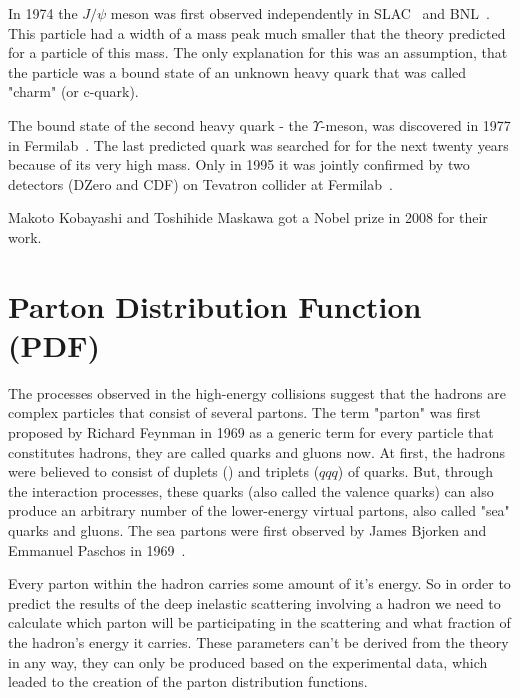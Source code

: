 In 1974 the $J/\psi$ meson was first observed independently in SLAC~\cite{lib:theory_qcd_jpsi2} and BNL~\cite{lib:theory_qcd_jpsi1}. This particle had a width of a mass peak much smaller that the theory predicted for a particle of this mass. The only explanation for this was an assumption, that the particle was a bound state of an unknown heavy quark that was called "charm" (or c-quark).

The bound state of the second heavy quark - the $\Upsilon$-meson, was discovered in 1977 in Fermilab~\cite{lib:theory_qcd_upsilon}. The last predicted quark was searched for for the next twenty years because of its very high mass. Only in 1995 it was jointly confirmed by two detectors (DZero and CDF) on Tevatron collider at Fermilab~\cite{lib:theory_qcd_top}.

Makoto Kobayashi and Toshihide Maskawa got a Nobel prize in 2008 for their work.

\section{Parton Distribution Function (PDF)}
\label{sec:TH_PDF}
The processes observed in the high-energy collisions suggest that the hadrons are complex particles that consist of several partons. The term "parton" was first proposed by Richard Feynman in 1969 as a generic term for every particle that constitutes hadrons, they are called quarks and gluons now. At first, the hadrons were believed to consist of duplets (\qqbar) and triplets ($qqq$) of quarks. But, through the interaction processes, these quarks (also called the valence quarks) can also produce an arbitrary number of the lower-energy virtual partons, also called "sea" quarks and gluons. The sea partons were first observed by James Bjorken and Emmanuel  Paschos in 1969~\cite{lib:theory_proton}.

Every parton within the hadron carries some amount of it's energy. So in order to predict the results of the deep inelastic scattering involving a hadron we need to calculate which parton will be participating in the scattering and what fraction of the hadron's energy it carries. These parameters can't be derived from the theory in any way, they can only be produced based on the experimental data, which leaded to the creation of the parton distribution functions.

